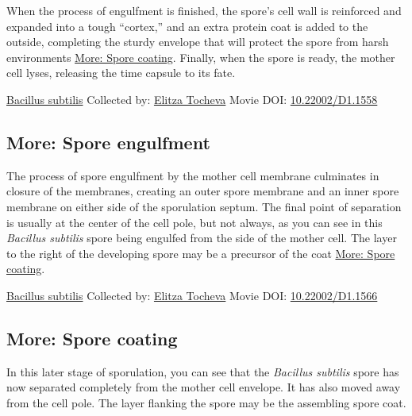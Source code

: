 \documentclass[]{tufte-book}
\begin{document}
When the process of engulfment is finished, the spore's cell wall is reinforced and expanded into a tough ``cortex,'' and an extra protein coat is added to the outside, completing the sturdy envelope that will protect the spore from harsh environments \protect\hyperlink{Spore_coating}{More: Spore coating}. Finally, when the spore is ready, the mother cell lyses, releasing the time capsule to its fate.



\hypertarget{htmlwidget-4dc33173943417e61689}{}

\label{fig:8-6}\protect\hyperlink{tree}{Bacillus subtilis} Collected by: \protect\hyperlink{elitza_tocheva}{Elitza Tocheva} Movie DOI: \href{https://doi.org/10.22002/D1.1558}{10.22002/D1.1558}

\hypertarget{Spore_engulfment}{%
\subsection*{More: Spore engulfment}\label{Spore_engulfment}}

The process of spore engulfment by the mother cell membrane culminates in closure of the membranes, creating an outer spore membrane and an inner spore membrane on either side of the sporulation septum. The final point of separation is usually at the center of the cell pole, but not always, as you can see in this \emph{Bacillus subtilis} spore being engulfed from the side of the mother cell. The layer to the right of the developing spore may be a precursor of the coat \protect\hyperlink{Spore_coating}{More: Spore coating}.



\hypertarget{htmlwidget-57b958fd823d379b94f0}{}

\label{fig:8-6a}\protect\hyperlink{tree}{Bacillus subtilis} Collected by: \protect\hyperlink{elitza_tocheva}{Elitza Tocheva} Movie DOI: \href{https://doi.org/10.22002/D1.1566}{10.22002/D1.1566}

\hypertarget{Spore_coating}{%
\subsection*{More: Spore coating}\label{Spore_coating}}

In this later stage of sporulation, you can see that the \emph{Bacillus subtilis} spore has now separated completely from the mother cell envelope. It has also moved away from the cell pole. The layer flanking the spore may be the assembling spore coat.
\end{document}

